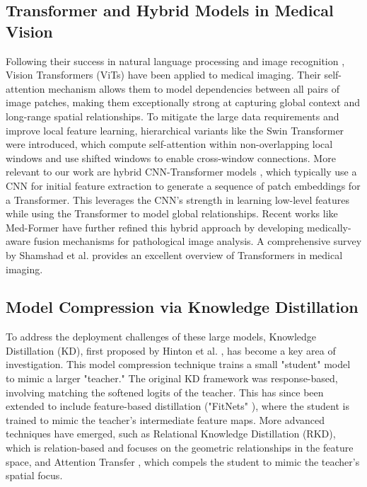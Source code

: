 \subsection{Transformer and Hybrid Models in Medical Vision} 
Following their success in natural language processing and image recognition \cite{dosovitskiy2021vit}, Vision Transformers (ViTs) have been applied to medical imaging. Their self-attention mechanism allows them to model dependencies between all pairs of image patches, making them exceptionally strong at capturing global context and long-range spatial relationships. To mitigate the large data requirements and improve local feature learning, hierarchical variants like the Swin Transformer \cite{liu2021swin} were introduced, which compute self-attention within non-overlapping local windows and use shifted windows to enable cross-window connections. More relevant to our work are hybrid CNN-Transformer models \cite{dai2021coatnet}, which typically use a CNN for initial feature extraction to generate a sequence of patch embeddings for a Transformer. This leverages the CNN's strength in learning low-level features while using the Transformer to model global relationships. Recent works like Med-Former \cite{researcher2023medformer} have further refined this hybrid approach by developing medically-aware fusion mechanisms for pathological image analysis. A comprehensive survey by Shamshad et al. \cite{shamshad2023survey} provides an excellent overview of Transformers in medical imaging.

\subsection{Model Compression via Knowledge Distillation} 
To address the deployment challenges of these large models, Knowledge Distillation (KD), first proposed by Hinton et al. \cite{hinton2015distill}, has become a key area of investigation. This model compression technique trains a small "student" model to mimic a larger "teacher." The original KD framework was response-based, involving matching the softened logits of the teacher. This has since been extended to include feature-based distillation ("FitNets" \cite{romero2014fitnets}), where the student is trained to mimic the teacher's intermediate feature maps. More advanced techniques have emerged, such as Relational Knowledge Distillation (RKD), which is relation-based and focuses on the geometric relationships in the feature space, and Attention Transfer \cite{park2019relational}, which compels the student to mimic the teacher's spatial focus.

